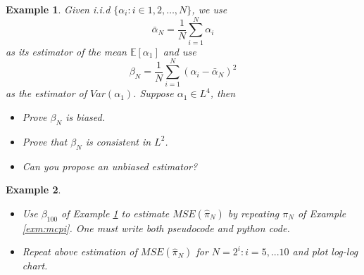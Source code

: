 \documentclass{article}
\newtheorem{example}{Example}
\begin{document}
\begin{example} \label{exm:mse}
 Given i.i.d $\{\alpha_i: i\in 1, 2, \ldots, N\}$, we use 
$$\bar \alpha_N = \frac 1 N \sum_{i=1}^N \alpha_i$$
as its estimator of the mean $\mathbb E[\alpha_1]$ 
and use
$$\beta_N = \frac 1 N \sum_{i=1}^N (\alpha_i -\bar \alpha_N)^2$$
as the estimator of $Var(\alpha_1)$. Suppose $\alpha_1\in L^4$, then 
\begin{itemize}
 \item Prove $\beta_N$ is biased.
 \item Prove that $\beta_N$ is consistent in $L^2$.
 \item Can you propose an unbiased estimator?
 \end{itemize}
\end{example}
\begin{example}
\begin{itemize}
 \item Use $\beta_{100}$ of Example \ref{exm:mse} to estimate 
 $MSE(\hat \pi_{N})$ by repeating $\pi_{N}$ of Example \ref{exm:mcpi}. One must write both pseudocode and python code.
 \item Repeat above estimation of $MSE(\hat \pi_{N})$ for $N= 2^{i}: i = 5, ...10$ and plot log-log chart.
\end{itemize}
 
\end{example}
\end{document}
